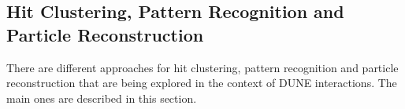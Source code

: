 

\subsection{Hit Clustering, Pattern Recognition and Particle Reconstruction}

There are different approaches for hit clustering, pattern recognition and particle reconstruction that are being explored in the context of DUNE  interactions. The main ones are described in this section.  

